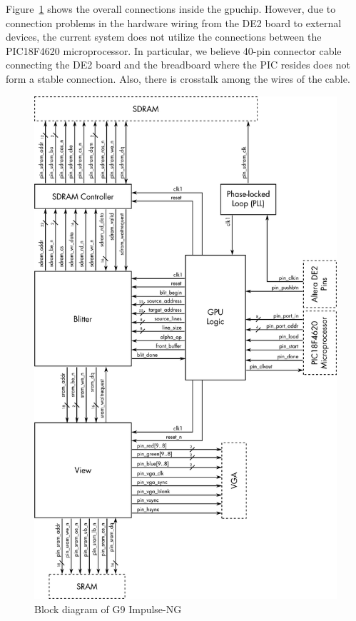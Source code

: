 \documentclass{report}
\begin{document}
Figure~\ref{fig:block_diagram} shows the overall connections inside the gpuchip.
 However, due to connection problems in the hardware wiring 
from the DE2 board to external devices, the current system does not 
utilize the connections between the PIC18F4620 microprocessor. In
particular, we believe 40-pin connector cable connecting the DE2 board
and the breadboard where the PIC resides does not form a stable
connection. Also, there is crosstalk among the wires of the cable.

\begin{figure}
    \begin{center}
        \vspace{-0.875in}
        \includegraphics[width=4.5in]{gpu-inside}
    \end{center}
    \caption{Block diagram of G9 Impulse-NG}
    \label{fig:block_diagram}
\end{figure}
\end{document}
